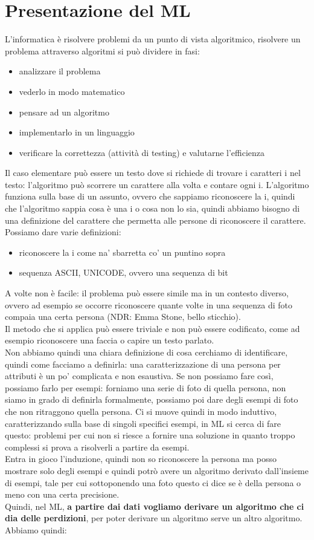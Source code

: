 \documentclass[12pt, oneside]{extbook}
\begin{document}
\section{Presentazione del ML}
L'informatica è risolvere problemi da un punto di vista algoritmico, risolvere un problema attraverso algoritmi si può dividere in fasi:
\begin{itemize}
	\item analizzare il problema
	\item vederlo in modo matematico
	\item pensare ad un algoritmo
	\item implementarlo in un linguaggio
	\item verificare la correttezza (attività di testing) e valutarne l'efficienza
\end{itemize}
Il caso elementare può essere un testo dove si richiede di trovare i caratteri i nel testo: l'algoritmo può scorrere un carattere alla volta e contare ogni i. L'algoritmo funziona sulla base di un assunto, ovvero che sappiamo riconoscere la i, quindi che l'algoritmo sappia cosa è una i o cosa non lo sia, quindi abbiamo bisogno di una definizione del carattere che permetta alle persone di riconoscere il carattere.\\Possiamo dare varie definizioni:
\begin{itemize}
	\item riconoscere la i come na' sbarretta co' un puntino sopra
	\item sequenza ASCII, UNICODE, ovvero una sequenza di bit
\end{itemize}
A volte non è facile: il problema può essere simile ma in un contesto diverso, ovvero ad esempio se occorre riconoscere quante volte in una sequenza di foto compaia una certa persona (NDR: Emma Stone, bello sticchio).\\Il metodo che si applica può essere triviale e non può essere codificato, come ad esempio riconoscere una faccia o capire un testo parlato.\\Non abbiamo quindi una chiara definizione di cosa cerchiamo di identificare, quindi come facciamo a definirla: una caratterizzazione di una persona per attributi è un po' complicata e non esaustiva. Se non possiamo fare così, possiamo farlo per esempi: forniamo una serie di foto di quella persona, non siamo in grado di definirla formalmente, possiamo poi dare degli esempi di foto che non ritraggono quella persona. Ci si muove quindi in modo induttivo, caratterizzando sulla base di singoli specifici esempi, in ML si cerca di fare questo: problemi per cui non si riesce a fornire una soluzione in quanto troppo complessi si prova a risolverli a partire da esempi.\\Entra in gioco l'induzione, quindi non so riconoscere la persona ma posso mostrare solo degli esempi e quindi potrò avere un algoritmo derivato dall'insieme di esempi, tale per cui sottoponendo una foto questo ci dice se è della persona o meno con una certa precisione.\\Quindi, nel ML, \textbf{a partire dai dati vogliamo derivare un algoritmo che ci dia delle perdizioni}, per poter derivare un algoritmo serve un altro algoritmo.\\Abbiamo quindi:
\end{document}
